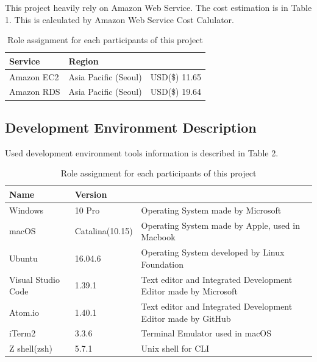 \documentclass[conference,compsoc]{IEEEtran}
\begin{document}
This project heavily rely on Amazon Web Service. The cost estimation is in Table 1. This is calculated by Amazon Web Service Cost Calulator.

\begin{table}[ht!] \renewcommand\arraystretch{1.25}
  \begin{threeparttable}
      \caption{Role assignment for each participants of this project%
      \label{tab:table1}}    %
      \begin{tabular}{@{}l l>{\raggedright\arraybackslash}p{3.8cm}@{}}
      \toprule
      \bfseries Service & \bfseries Region & \multicolumn{1}{l}{\bfseries Cost(Monthly)} \\
      \midrule
      Amazon EC2 & Asia Pacific (Seoul) & USD(\$) 11.65 \\
      Amazon RDS & Asia Pacific (Seoul) & USD(\$) 19.64 \\
      \bottomrule
      \end{tabular}
  \end{threeparttable}
\end{table}

\subsection{Development Environment Description}

Used development environment tools information is described in Table 2.

\begin{table}[ht!] \renewcommand\arraystretch{1.25}
  \begin{threeparttable}
      \caption{Role assignment for each participants of this project%
      \label{tab:table2}}    %
      \begin{tabular}{@{}l l>{\raggedright\arraybackslash}p{3.8cm}@{}}
      \toprule
      \bfseries Name & \bfseries Version & \multicolumn{1}{l}{\bfseries Description} \\
      \midrule
      Windows & 10 Pro & Operating System made by Microsoft \\
      macOS & Catalina(10.15) & Operating System made by Apple, used in Macbook \\
      Ubuntu & 16.04.6 & Operating System developed by Linux Foundation \\
      Visual Studio Code & 1.39.1 & Text editor and Integrated Development Editor made by Microsoft \\
      Atom.io & 1.40.1 & Text editor and Integrated Development Editor made by GitHub \\
      iTerm2 & 3.3.6 & Terminal Emulator used in macOS \\
      Z shell(zsh) & 5.7.1 & Unix shell for CLI \\
      \bottomrule
      \end{tabular}
  \end{threeparttable}
\end{table}
\end{document}
